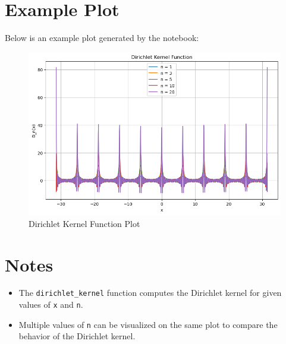 \documentclass{article}
\begin{document}
\section{Example Plot}

Below is an example plot generated by the notebook:

\begin{figure}[h]
    \centering
    \includegraphics[width=\textwidth]{images/dirichlet_kernel_plot.png}
    \caption{Dirichlet Kernel Function Plot}
\end{figure}

\section{Notes}

\begin{itemize}
    \item The \texttt{dirichlet\_kernel} function computes the Dirichlet kernel for given values of \texttt{x} and \texttt{n}.
    \item Multiple values of \texttt{n} can be visualized on the same plot to compare the behavior of the Dirichlet kernel.
\end{itemize}
\end{document}
